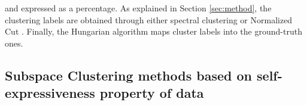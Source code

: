 \documentclass[10pt,a4paper,conference]{IEEEtran}
\begin{document}
and expressed as a percentage. As explained in Section \ref{sec:method}, the clustering labels are obtained through either spectral clustering \cite{pedregosa2011scikit} or Normalized Cut \cite{shi2000normalized}. Finally, the Hungarian algorithm \cite{vidal2011subspace} maps cluster labels into the ground-truth ones.

\subsection{Subspace Clustering methods based on self-expressiveness property of data}\label{sec:res_SSC}

\begin{table}[!t]\centering
\caption{Clustering accuracy (\%) of subspace clustering methods as well as k-means (Km) and spectral clustering (Sc). AVG and STD stand for the average and standard deviation of results at each column. The best performance for each dataset emphasized in bold.}
\label{table:SSC}
\end{table}
\end{document}
